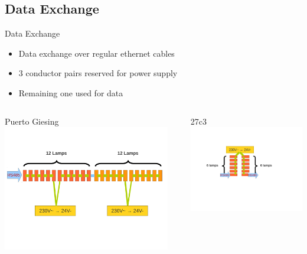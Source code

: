 \documentclass{beamer}
\begin{document}
\subsection{Data Exchange}
  \begin{frame}{Data Exchange}
    \begin{itemize}
      \item Data exchange over regular ethernet cables
      \item 3 conductor pairs reserved for power supply
      \item Remaining one used for data
    \end{itemize}
    \begin{columns}[T]
      \begin{column}{7cm}
        \hskip 2.6cm
        Puerto Giesing
        \vskip 0.2cm
        \includegraphics[width=7.3cm, clip, trim= 0cm 4.6cm 0.5cm 4cm]{bilder/12lampen_rs485.pdf}
      \end{column}
      \begin{column}{5cm}
        \hskip 2.0cm
        27c3
        \vskip 0.7cm
         \includegraphics[width=5.5cm, clip, trim= 2.5cm 8cm 3.5cm 4cm]{bilder/6lampen_rs485.pdf}
      \end{column}
    \end{columns}
  \end{frame}
\end{document}
